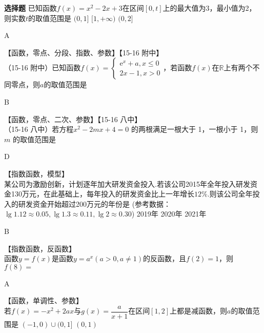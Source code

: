 \begin{exercise}{\bf 选择题}
      已知函数$f(x)=x^2-2x+3$在区间$[0,t]$上的最大值为3，最小值为2，则实数$t$的取值范围是\xz
        \xx{$[1,2]$}
        {$(0,1]$}
        {$[1,+\infty)$}
        {$(0,2]$}
      \begin{answer}
        A
      \end{answer}
    \item 【函数，零点、分段、指数、参数】【15-16 附中】\\
      （15-16 附中）已知函数$f(x)=\begin{cases}\mathrm{e}^x+a,x\leq0\\2x-1,x>0 \end{cases} $，若函数$f(x)$在$\mathbb{R}$上有两个不同零点，则$a$的取值范围是\xz
      \xx{$[-1,+\infty)$}{$(-1,+\infty)$}{$(-1,0)$}{$[-1,0)$}
      \begin{answer}
        B
      \end{answer}
    \item 【函数，零点、二次、参数】【15-16 八中】\\
      （15-16 八中）若方程$x^2-2mx+4=0$ 的两根满足一根大于 1，一根小于 1，则$m$ 的取值范围是\xz
      \begin{answer}
        D
      \end{answer}
    \item 【指数函数，模型】\\
      某公司为激励创新，计划逐年加大研发资金投入.若该公司2015年全年投入研发资金130万元，在此基础上，每年投入的研发资金比上一年增长$12\%$.则该公司全年投入的研发资金开始超过200万元的年份是
      (参考数据：$\lg1.12\approx0.05,\lg1.3\approx0.11,\lg2\approx0.30$)\xz
        {2019年}
        {2020年}
        {2021年}
      \begin{answer}
        B
      \end{answer}
    \item 【指数函数，反函数】\\
      函数$y=f(x)$是函数$y=a^x(a>0,a\neq1)$的反函数，且$f(2)=1$，则$f(8)=$\xz
      \begin{answer}
        A
      \end{answer}
    \item 【函数，单调性、参数】\\
      若$f(x)=-x^2+2ax$与$g(x)=\dfrac{a}{x+1}$在区间$[1,2]$上都是减函数，则$a$的取值范围是\xz
        {$(-1,0)\cup (0,1]$}
        {$(0,1)$}

\end{exercise}
